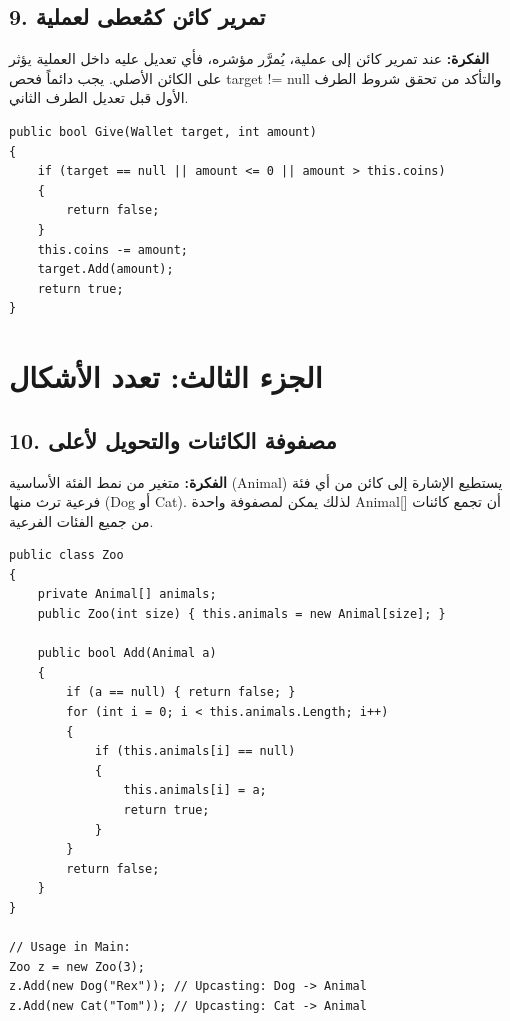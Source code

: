 \documentclass[14pt]{extarticle}
\begin{document}
\filbreak
\subsection*{9. تمرير كائن كمُعطى لعملية}
\textbf{الفكرة:} عند تمرير كائن إلى عملية، يُمرَّر مؤشره، فأي تعديل عليه داخل العملية يؤثر على الكائن الأصلي. يجب دائماً فحص \textenglish{target != null} والتأكد من تحقق شروط الطرف الأول قبل تعديل الطرف الثاني.

\begin{boxCode}
\begin{english}
\begin{verbatim}
public bool Give(Wallet target, int amount)
{
    if (target == null || amount <= 0 || amount > this.coins)
    {
        return false;
    }
    this.coins -= amount;
    target.Add(amount);
    return true;
}
\end{verbatim}
\end{english}
\end{boxCode}

\filbreak
\section*{الجزء الثالث: تعدد الأشكال}

\subsection*{10. مصفوفة الكائنات والتحويل لأعلى}
\textbf{الفكرة:} متغير من نمط الفئة الأساسية (\textenglish{Animal}) يستطيع الإشارة إلى كائن من أي فئة فرعية ترث منها (\textenglish{Dog} أو \textenglish{Cat}). لذلك يمكن لمصفوفة واحدة \textenglish{Animal[]} أن تجمع كائنات من جميع الفئات الفرعية.

\begin{boxCode}
\begin{english}
\begin{verbatim}
public class Zoo
{
    private Animal[] animals;
    public Zoo(int size) { this.animals = new Animal[size]; }

    public bool Add(Animal a)
    {
        if (a == null) { return false; }
        for (int i = 0; i < this.animals.Length; i++)
        {
            if (this.animals[i] == null)
            {
                this.animals[i] = a;
                return true;
            }
        }
        return false;
    }
}

// Usage in Main:
Zoo z = new Zoo(3);
z.Add(new Dog("Rex")); // Upcasting: Dog -> Animal
z.Add(new Cat("Tom")); // Upcasting: Cat -> Animal
\end{verbatim}
\end{english}
\end{boxCode}
\end{document}
